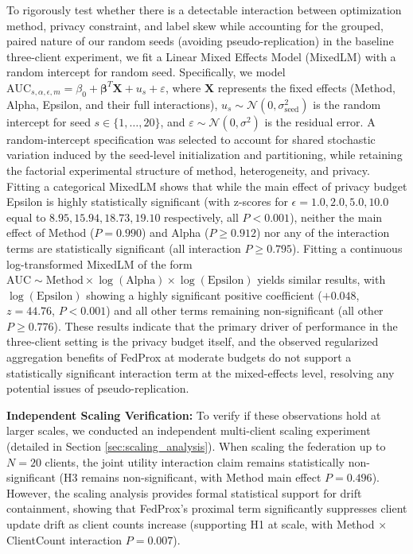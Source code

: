 \documentclass[conference]{IEEEtran}
\begin{document}
To rigorously test whether there is a detectable interaction between optimization method, privacy constraint, and label skew while accounting for the grouped, paired nature of our random seeds (avoiding pseudo-replication) in the baseline three-client experiment, we fit a Linear Mixed Effects Model (MixedLM) with a random intercept for random seed. Specifically, we model $\text{AUC}_{s,\alpha,\epsilon,m} = \beta_0 + \mathbf{\beta}^T \mathbf{X} + u_s + \varepsilon$, where $\mathbf{X}$ represents the fixed effects (Method, Alpha, Epsilon, and their full interactions), $u_s \sim \mathcal{N}(0, \sigma^2_{\text{seed}})$ is the random intercept for seed $s \in \{1,\dots,20\}$, and $\varepsilon \sim \mathcal{N}(0, \sigma^2)$ is the residual error. A random-intercept specification was selected to account for shared stochastic variation induced by the seed-level initialization and partitioning, while retaining the factorial experimental structure of method, heterogeneity, and privacy. Fitting a categorical MixedLM shows that while the main effect of privacy budget Epsilon is highly statistically significant (with z-scores for $\epsilon=1.0, 2.0, 5.0, 10.0$ equal to $8.95, 15.94, 18.73, 19.10$ respectively, all $P < 0.001$), neither the main effect of Method ($P=0.990$) and Alpha ($P \ge 0.912$) nor any of the interaction terms are statistically significant (all interaction $P \ge 0.795$). Fitting a continuous log-transformed MixedLM of the form $\text{AUC} \sim \text{Method} \times \log(\text{Alpha}) \times \log(\text{Epsilon})$ yields similar results, with $\log(\text{Epsilon})$ showing a highly significant positive coefficient ($+0.048$, $z=44.76$, $P < 0.001$) and all other terms remaining non-significant (all other $P \ge 0.776$). These results indicate that the primary driver of performance in the three-client setting is the privacy budget itself, and the observed regularized aggregation benefits of FedProx at moderate budgets do not support a statistically significant interaction term at the mixed-effects level, resolving any potential issues of pseudo-replication.

\noindent\textbf{Independent Scaling Verification:} To verify if these observations hold at larger scales, we conducted an independent multi-client scaling experiment (detailed in Section \ref{sec:scaling_analysis}). When scaling the federation up to $N=20$ clients, the joint utility interaction claim remains statistically non-significant (H3 remains non-significant, with Method main effect $P=0.496$). However, the scaling analysis provides formal statistical support for drift containment, showing that FedProx's proximal term significantly suppresses client update drift as client counts increase (supporting H1 at scale, with Method $\times$ ClientCount interaction $P=0.007$).
\end{document}

